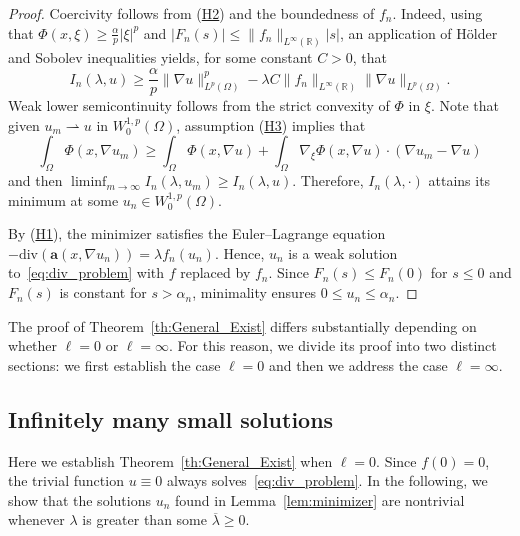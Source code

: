 \documentclass[10pt,twoside,english,reqno,a4paper]{amsart}
\theoremstyle{plain}
\theoremstyle{plain}
\theoremstyle{definition}
\theoremstyle{remark}
\numberwithin{equation}{section}
\newcommand{\R}{\mathbb{R}}
\def\sob{W^{1,p}_{0}(\Omega)}
\def\div{\mathrm{div}}
\def\into{\int_{\Omega}}
\begin{document}
\begin{proof}
Coercivity follows from (\hyperlink{hyp:growth}{H2}) and the boundedness of $f_n$. Indeed, using that $\Phi(x,\xi) \geq \frac{\alpha}{p}|\xi|^p$ and $|F_n(s)| \leq \|f_n\|_{L^\infty(\R)} |s|$, an application of H\"older and Sobolev inequalities yields, for some constant $C>0$, that
\[
I_n(\lambda, u) \geq \frac{\alpha}{p} \|\nabla u\|_{L^p(\Omega)}^p - \lambda C \|f_n\|_{L^\infty(\R)} \|\nabla u\|_{L^p(\Omega)}.
\]
Weak lower semicontinuity follows from the strict convexity of $\Phi$ in $\xi$. Note that given $u_m\rightharpoonup u$ in $\sob$, assumption (\hyperlink{hyp:convex}{H3}) implies that
\[
\into \Phi(x,\nabla u_m) \geq \into \Phi(x,\nabla u) + \into \nabla_\xi \Phi(x,\nabla u) \cdot (\nabla u_m - \nabla u)
\]
and then $\liminf_{m\to\infty} I_n(\lambda,u_m) \geq I_n(\lambda,u)$. Therefore, $I_n(\lambda, \cdot)$ attains its minimum at some $u_n \in \sob$.

By (\hyperlink{hyp:potential}{H1}), the minimizer satisfies the Euler--Lagrange equation $-\div(\mathbf{a}(x,\nabla u_n)) = \lambda f_n(u_n)$. Hence, $u_n$ is a weak solution to~\eqref{eq:div_problem} with $f$ replaced by $f_n$. Since $F_n(s)\leq F_n(0)$ for $s\leq 0$ and $F_n(s)$ is constant for $s > \alpha_n$, minimality ensures $0\leq u_n\leq\alpha_{n}$.
\end{proof}

The proof of Theorem~\ref{th:General_Exist} differs substantially depending on whether $\ell=0$ or $\ell=\infty$. For this reason, we divide its proof into two distinct sections: we first establish the case $\ell=0$ and then we address the case $\ell=\infty$.

\subsection{Infinitely many small solutions}

Here we establish Theorem~\ref{th:General_Exist} when $\ell=0$. Since $f(0)=0$, the trivial function $u\equiv 0$ always solves~\eqref{eq:div_problem}. In the following, we show that the solutions $u_n$ found in Lemma~\ref{lem:minimizer} are nontrivial whenever $\lambda$ is greater than some $\overline{\lambda}\geq 0$.
\end{document}
